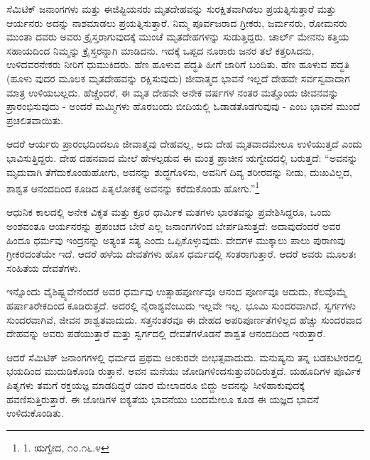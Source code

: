 ಸೆಮಿಟಿಕ್ ಜನಾಂಗಗಳು ಮತ್ತು ಈಜಿಪ್ಟಿಯನರು ಮೃತದೇಹವನ್ನು ಸುರಕ್ಷಿತವಾಗಿಡಲು ಪ್ರಯತ್ನಿಸುತ್ತಾರೆ ಮತ್ತು ಆರ್ಯನರು ಅದನ್ನು ನಾಶಮಾಡಲು ಪ್ರಯತ್ನಿಸುತ್ತಾರೆ. ನಿಮ್ಮ ಪೂರ್ವಜರಾದ ಗ್ರೀಕರು, ಜರ್ಮನರು, ರೋಮನರು ಮುಂತಾ ದವರು ಅವರು ಕ್ರೈಸ್ತರಾಗುವುದಕ್ಕೆ ಮುಂಚೆ ಮೃತದೇಹಗಳನ್ನು ಸುಡುತ್ತಿದ್ದರು. ಚಾರ್ಲ್ ಮೇನನು ಕತ್ತಿಯ ಸಹಾಯದಿಂದ ನಿಮ್ಮನ್ನು ಕ್ರೈಸ್ತರನ್ನಾಗಿ ಮಾಡಿದನು. ಇದಕ್ಕೆ ಒಪ್ಪದ ನೂರಾರು ಜನರ ತಲೆ ಕತ್ತರಿಸಿದನು, ಉಳಿದವರನೇಕರು ನೀರಿಗೆ ಧುಮುಕಿದರು. ಹೆಣ ಹೂಳುವ ಪದ್ಧತಿ ಹೀಗೆ ಜಾರಿಗೆ ಬಂದಿತು. ಹೆಣ ಹೂಳುವ ಪದ್ಧತಿ (ಹೂಳು ವುದರ ಮೂಲಕ ಮೃತದೇಹವನ್ನು ರಕ್ಷಿಸುವುದು) ಜೀವಾತ್ಮದ ಭಾವನೆ ಇಲ್ಲದೆ ದೇಹವೇ ಸರ್ವಸ್ವವಾದಾಗ ಮಾತ್ರ ಉಳಿಯಬಲ್ಲದು. ಹೆಚ್ಚೆಂದರೆ, ಈ ಮೃತ ದೇಹವೇ ಅನೇಕ ವರ್ಷಗಳ ನಂತರ ಮತ್ತೊಂದು ಜೀವನವನ್ನು ಪ್ರಾರಂಭಿಸುವುದು - ಅಂದರೆ ಮಮ್ಮಿಗಳು ಹೊರಬಂದು ಬೀದಿಯಲ್ಲಿ ಓಡಾಡತೊಡಗುವುವು - ಎಂಬ ಭಾವನೆ ಮುಂದೆ ಪ್ರಚಲಿತವಾಯಿತು.

ಆದರೆ ಆರ್ಯರು ಪ್ರಾರಂಭದಿಂದಲೂ ಜೀವಾತ್ಮವು ದೇಹವಲ್ಲ, ಅದು ದೇಹ ಮೃತವಾದಮೇಲೂ ಉಳಿಯುತ್ತದೆ ಎಂದು ಭಾವಿಸುತ್ತಿದ್ದರು. ದೇಹ ದಹನವಾದ ಮೇಲೆ ಹೇಳಲ್ಪಡುವ ಈ ಮಂತ್ರ ಪ್ರಾಚೀನ ಋಗ್ವೇದದಲ್ಲಿ ಬರುತ್ತದೆ: “ಅವನನ್ನು ಮೃದುವಾಗಿ ತೆಗೆದುಕೊಂಡುಹೋಗು, ಅವನನ್ನು ಶುದ್ಧಗೊಳಿಸು, ಅವನಿಗೆ ದಿವ್ಯ ಶರೀರವನ್ನು ನೀಡು, ದುಃಖವಿಲ್ಲದ, ಶಾಶ್ವತ ಆನಂದದಿಂದ ಕೂಡಿದ ಪಿತೃಲೋಕಕ್ಕೆ ಅವನನ್ನು ಕರೆದುಕೊಂಡು ಹೋಗು.”\footnote{1. ಋಗ್ವೇದ, ೧೦.೧೬.೪}

ಆಧುನಿಕ ಕಾಲದಲ್ಲಿ ಅನೇಕ ವಿಕೃತ ಮತ್ತು ಕ್ರೂರ ಧಾರ್ಮಿಕ ಮತಗಳು ಭಾರತವನ್ನು ಪ್ರವೇಶಿಸಿದ್ದರೂ, ಒಂದು ಅಂಶವಂತೂ ಆರ್ಯನರನ್ನು ಪ್ರಪಂಚದ ಬೇರೆ ಎಲ್ಲ ಜನಾಂಗಗಳಿಂದ ಬೇರ್ಪಡಿಸುತ್ತದೆ: ಅದಾವುದೆಂದರೆ ಅವರ ಹಿಂದೂ ಧರ್ಮವು ಇಂದ್ರನನ್ನು ಅತ್ಯಂತ ಸತ್ಯ ಎಂದು ಒಪ್ಪಿಕೊಳ್ಳುವುದು. ವೇದಗಳ ಮುಕ್ಕಾಲು ಪಾಲು ಪುರಾಣವು ಗ್ರೀಕರದಂತೆಯೇ ಇದೆ. ಆದರೆ ಹಳೆಯ ದೇವತೆಗಳು ಹೊಸ ಧರ್ಮದಲ್ಲಿ ಸಂತರಾಗುತ್ತಾರೆ. ಆದರೆ ಅವರು ಮೂಲತಃ ಸಂಹಿತೆಯ ದೇವತೆಗಳು.

ಇನ್ನೊಂದು ವೈಶಿಷ್ಟ್ಯವೇನೆಂದರೆ ಅವರ ಧರ್ಮವು ಉತ್ಸಾಹಪೂರ್ಣವೂ ಆನಂದ ಪೂರ್ಣವೂ ಆದುದು, ಕೆಲವೊಮ್ಮೆ ಹರ್ಷಾತಿರೇಕದಿಂದ ಕೂಡಿರುತ್ತದೆ. ಅದರಲ್ಲಿ ನೈರಾಶ್ಯವೆಂಬುದು ಇಲ್ಲವೇ ಇಲ್ಲ. ಭೂಮಿ ಸುಂದರವಾಗಿದೆ, ಸ್ವರ್ಗಗಳು ಸುಂದರವಾಗಿವೆ, ಜೀವನ ಶಾಶ್ವತವಾದುದು. ಸತ್ತನಂತರವೂ ಈ ದೇಹದ ಅಪರಿಪೂರ್ಣತೆಗಳಿಲ್ಲದ ಹೆಚ್ಚು ಸುಂದರವಾದ ದೇಹವನ್ನು ಅವರು ಪಡೆಯುತ್ತಾರೆ ಮತ್ತು ಸ್ವರ್ಗದಲ್ಲಿ ದೇವತೆಗಳೊಡನೆ ಶಾಶ್ವತ ಆನಂದದಿಂದ ಇರುತ್ತಾರೆ.

ಆದರೆ ಸೆಮಿಟಿಕ್ ಜನಾಂಗಗಳಲ್ಲಿ ಧರ್ಮದ ಪ್ರಥಮ ಅಂಕುರವೇ ಬೀಭತ್ಸವಾದುದು. ಮನುಷ್ಯನು ತನ್ನ ಬಡಕುಟೀರದಲ್ಲಿ ಭಯದಿಂದ ಮುದುಡಿಕೊಂಡಿ ರುತ್ತಾನೆ. ಅವನ ಮನೆಯು ಜೋಡಿಗಳಿಂದಸುತ್ತುವರಿದಿರುತ್ತದೆ. ಯಹೂದಿಗಳ ಪೂರ್ವಿಕ ಪಿತೃಗಳು ತಮಗೆ ರಕ್ತಯಜ್ಞ ಮಾಡದಿದ್ದರೆ ಯಾರ ಮೇಲಾದರೂ ಬಿದ್ದು ಅವನನ್ನು ಸೀಳಿಹಾಕುವುದಕ್ಕೆ ಹವಣಿಸುತ್ತಿರುತ್ತಾರೆ. ಈ ಜೋಡಿಗಳ ಐಕ್ಯತೆಯ ಭಾವನೆಯು ಬಂದಮೇಲೂ ಕೂಡ ಈ ಯಜ್ಞದ ಭಾವನೆ ಉಳಿದುಕೊಂಡಿತು.

